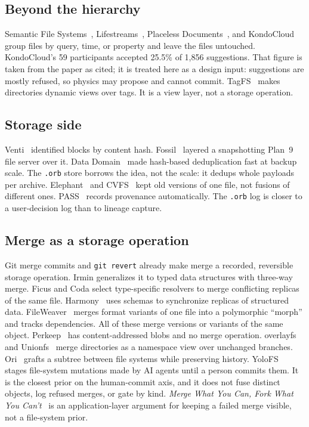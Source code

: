 \documentclass[11pt]{article}
\begin{document}
\subsection{Beyond the hierarchy}

Semantic File Systems~\cite{gifford1991}, Lifestreams~\cite{fertig1996}, Placeless Documents~\cite{dourish2000}, and KondoCloud~\cite{brackenbury2021} group files by query, time, or property and leave the files untouched.
KondoCloud's 59 participants accepted 25.5\% of 1,856 suggestions.
That figure is taken from the paper as cited; it is treated here as a design input: suggestions are mostly refused, so physics may propose and cannot commit.
TagFS~\cite{bloehdorn2006} makes directories dynamic views over tags.
It is a view layer, not a storage operation.

\subsection{Storage side}

Venti~\cite{quinlan2002} identified blocks by content hash.
Fossil~\cite{quinlanfossil} layered a snapshotting Plan~9 file server over it.
Data Domain~\cite{zhu2008} made hash-based deduplication fast at backup scale.
The \texttt{.orb} store borrows the idea, not the scale: it dedups whole payloads per archive.
Elephant~\cite{santry1999} and CVFS~\cite{soules2003} kept old versions of one file, not fusions of different ones.
PASS~\cite{muniswamy2006} records provenance automatically.
The \texttt{.orb} log is closer to a user-decision log than to lineage capture.

\subsection{Merge as a storage operation}

Git merge commits and \texttt{git revert} already make merge a recorded, reversible storage operation.
Irmin generalizes it to typed data structures with three-way merge.
Ficus and Coda select type-specific resolvers to merge conflicting replicas of the same file.
Harmony~\cite{foster2007} uses schemas to synchronize replicas of structured data.
FileWeaver~\cite{gori2020} merges format variants of one file into a polymorphic ``morph'' and tracks dependencies.
All of these merge versions or variants of the same object.
Perkeep~\cite{perkeep} has content-addressed blobs and no merge operation.
overlayfs~\cite{overlayfs} and Unionfs~\cite{wright2006} merge directories as a namespace view over unchanged branches.
Ori~\cite{mashtizadeh2013} grafts a subtree between file systems while preserving history.
YoloFS~\cite{zhong2026} stages file-system mutations made by AI agents until a person commits them.
It is the closest prior on the human-commit axis, and it does not fuse distinct objects, log refused merges, or gate by kind.
\emph{Merge What You Can, Fork What You Can't}~\cite{schiefer2022} is an application-layer argument for keeping a failed merge visible, not a file-system prior.
\end{document}

